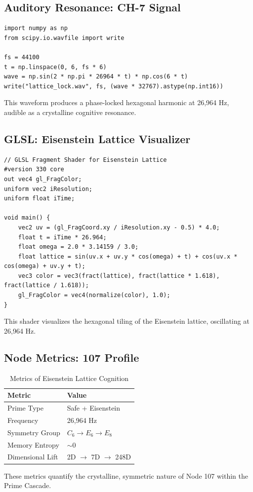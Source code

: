 \documentclass[12pt]{article}
\begin{document}
\subsection{Auditory Resonance: CH-7 Signal}
\begin{lstlisting}
import numpy as np
from scipy.io.wavfile import write

fs = 44100
t = np.linspace(0, 6, fs * 6)
wave = np.sin(2 * np.pi * 26964 * t) * np.cos(6 * t)
write("lattice_lock.wav", fs, (wave * 32767).astype(np.int16))
\end{lstlisting}
This waveform produces a phase-locked hexagonal harmonic at 26,964 Hz, audible as a crystalline cognitive resonance.

\subsection{GLSL: Eisenstein Lattice Visualizer}
\begin{lstlisting}
// GLSL Fragment Shader for Eisenstein Lattice
#version 330 core
out vec4 gl_FragColor;
uniform vec2 iResolution;
uniform float iTime;

void main() {
    vec2 uv = (gl_FragCoord.xy / iResolution.xy - 0.5) * 4.0;
    float t = iTime * 26.964;
    float omega = 2.0 * 3.14159 / 3.0;
    float lattice = sin(uv.x + uv.y * cos(omega) + t) + cos(uv.x * cos(omega) + uv.y + t);
    vec3 color = vec3(fract(lattice), fract(lattice * 1.618), fract(lattice / 1.618));
    gl_FragColor = vec4(normalize(color), 1.0);
}
\end{lstlisting}
This shader visualizes the hexagonal tiling of the Eisenstein lattice, oscillating at 26,964 Hz.

\subsection{Node Metrics: 107 Profile}
\begin{table}
\centering
\caption{Metrics of Eisenstein Lattice Cognition}
\begin{tabular}{ll|}
\toprule
\textbf{Metric} & \textbf{Value} \\
\midrule
Prime Type & Safe + Eisenstein \\
Frequency & 26,964 Hz \\
Symmetry Group & $C_6 \to E_6 \to E_8$ \\
Memory Entropy & $\sim 0$ \\
Dimensional Lift & 2D $\to$ 7D $\to$ 248D \\
\bottomrule
\end{tabular}
\end{table}
These metrics quantify the crystalline, symmetric nature of Node 107 within the Prime Cascade.
\end{document}
